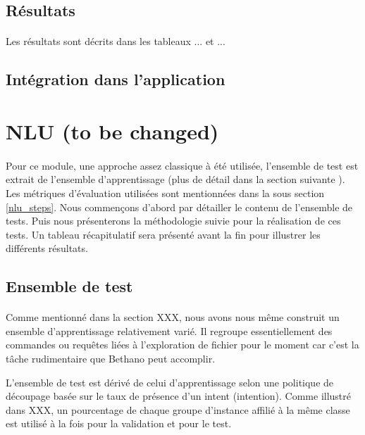 	\subsection{Résultats}
	\paragraph{}
	Les résultats sont décrits dans les tableaux ... et ...
	\subsection{Intégration dans l'application}

\section{NLU (to be changed)}
\paragraph{}
Pour ce module, une approche assez classique à été utilisée, l'ensemble de test est extrait de l'ensemble d'apprentissage (plus de détail dans la section suivante ). Les métriques d'évaluation utilisées sont mentionnées dans la sous section \ref{nlu_steps}. Nous commençons d'abord par détailler le contenu de l'ensemble de tests. Puis nous présenterons la méthodologie suivie pour la réalisation de ces tests. Un tableau récapitulatif sera présenté avant la fin pour illustrer les différents résultats.
	\subsection{Ensemble de test}
	\paragraph{}
	Comme mentionné dans la section XXX, nous avons nous même construit un ensemble d'apprentissage relativement varié. Il regroupe essentiellement des commandes ou requêtes liées à l'exploration de fichier pour le moment car c'est la tâche rudimentaire que Bethano peut accomplir.
	\par
	L'ensemble de test est dérivé de celui d'apprentissage selon une politique de découpage basée sur le taux de présence d'un intent (intention). Comme illustré dans XXX, un pourcentage de chaque groupe d'instance affilié à la même classe est utilisé à la fois pour la validation et pour le test.
	
